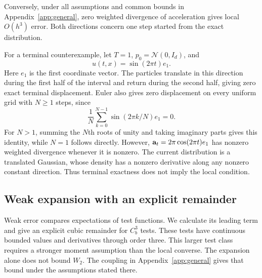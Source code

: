 Conversely, under all assumptions and common bounds in Appendix~\ref{app:general}, zero weighted divergence of acceleration gives local $O(h^3)$ error. Both directions concern one step started from the exact distribution.

For a terminal counterexample, let $T=1$, $p_0=\mathcal N(0,I_d)$, and
\[
 u(t,x)=\sin(2\pi t)e_1.
\]
Here $e_1$ is the first coordinate vector. The particles translate in this direction during the first half of the interval and return during the second half, giving zero exact terminal displacement. Euler also gives zero displacement on every uniform grid with $N\ge1$ steps, since
\[
 \frac1N\sum_{k=0}^{N-1}\sin(2\pi k/N)e_1=0.
\]
For $N>1$, summing the $N$th roots of unity and taking imaginary parts gives this identity, while $N=1$ follows directly. However, $\mathbf a_t=2\pi\cos(2\pi t)e_1$ has nonzero weighted divergence whenever it is nonzero. The current distribution is a translated Gaussian, whose density has a nonzero derivative along any nonzero constant direction. Thus terminal exactness does not imply the local condition.

\subsection{Weak expansion with an explicit remainder}
\label{app:weak}

Weak error compares expectations of test functions. We calculate its leading term and give an explicit cubic remainder for $C_b^3$ tests. These tests have continuous bounded values and derivatives through order three. This larger test class requires a stronger moment assumption than the local converse. The expansion alone does not bound $W_2$. The coupling in Appendix~\ref{app:general} gives that bound under the assumptions stated there.

